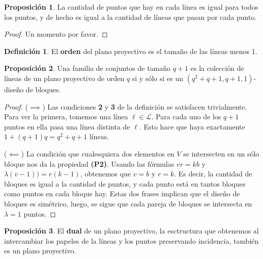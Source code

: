 \documentclass[spanish]{book}
\theoremstyle{definition}
\newtheorem*{defn}{Definición}
\newtheorem*{prop}{Proposición}
\begin{document}
\begin{prop}
	La cantidad de puntos que hay en cada línea es igual para todos los puntos, y de hecho es igual a la cantidad de líneas que pasan por cada punto.
\end{prop}
\begin{proof}
	Un momento por favor.
\end{proof}
\begin{defn}
	El \textbf{orden} del plano proyectivo es el tamaño de las líneas menos 1.
\end{defn}
\begin{prop}
	Una familia de conjuntos de tamaño $q+1$ es la colección de líneas de un plano proyectivo de orden $q$ si y sólo si es un $(q^2+q+1,q+1,1)$-diseño de bloques.
\end{prop}
\begin{proof}\leavevmode
	
	($\implies$) Las condiciones \textbf{2} y \textbf{3} de la definición se satisfacen trivialmente. Para ver la primera, tomemos una línea $\ell\in\mathcal{L}$. Para cada uno de los $q+1$ puntos en ella pasa una línea distinta de $\ell$. Esto hace que haya exactamente $1+(q+1)q=q^2+q+1$ líneas.
	
	($\impliedby$) La condición que cualesquiera dos elementos en $V$ se intersecten en un sólo bloque nos da la propiedad \textbf{(P2)}. Usando las fórmulas $vr=kb$ y $\lambda(v-1))=r(k-1)$, obtenemos que $v=b$ y $r=k$. Es decir, la cantidad de bloques es igual a la cantidad de puntos, y cada punto está en tantos bloques como puntos en cada bloque hay. Estas dos frases implican que el diseño de bloques es simétrico, luego, se sigue que cada pareja de bloques se intersecta en $\lambda=1$ puntos.
\end{proof}
\begin{prop}
	El \textbf{dual} de un plano proyectivo, la esctructura que obtenemos al intercambiar los papeles de la líneas y los puntos preservando incidencia, también es un plano proyectivo.
\end{prop}
\end{document}
